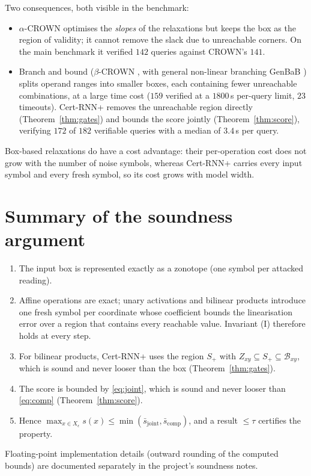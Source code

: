 \documentclass[11pt]{article}
\theoremstyle{definition}
\theoremstyle{remark}
\newcommand{\Bx}{\mathcal{B}}
\begin{document}
Two consequences, both visible in the benchmark:
\begin{itemize}
\item $\alpha$-CROWN \cite{xu2021alphacrown} optimises the \emph{slopes} of the relaxations but keeps the box as the region of validity; it cannot remove the slack due to unreachable corners. On the main benchmark it verified $142$ queries against CROWN's $141$.
\item Branch and bound ($\beta$-CROWN \cite{wang2021betacrown}, with general non-linear branching GenBaB \cite{shi2025genbab}) splits operand ranges into smaller boxes, each containing fewer unreachable combinations, at a large time cost ($159$ verified at a $1800$\,s per-query limit, $23$ timeouts). Cert-RNN+ removes the unreachable region directly (Theorem~\ref{thm:gates}) and bounds the score jointly (Theorem~\ref{thm:score}), verifying $172$ of $182$ verifiable queries with a median of $3.4$\,s per query.
\end{itemize}
Box-based relaxations do have a cost advantage: their per-operation cost does not grow with the number of noise symbols, whereas Cert-RNN+ carries every input symbol and every fresh symbol, so its cost grows with model width.

\section{Summary of the soundness argument}
\begin{enumerate}
\item The input box is represented exactly as a zonotope (one symbol per attacked reading).
\item Affine operations are exact; unary activations and bilinear products introduce one fresh symbol per coordinate whose coefficient bounds the linearisation error over a region that contains every reachable value. Invariant (I) therefore holds at every step.
\item For bilinear products, Cert-RNN+ uses the region $S_+$ with $Z_{xy}\subseteq S_+\subseteq\Bx_{xy}$, which is sound and never looser than the box (Theorem~\ref{thm:gates}).
\item The score is bounded by \eqref{eq:joint}, which is sound and never looser than \eqref{eq:comp} (Theorem~\ref{thm:score}).
\item Hence $\max_{x\in X_\epsilon} s(x) \le \min(\bar s_{\mathrm{joint}},\bar s_{\mathrm{comp}})$, and a result $\le\tau$ certifies the property.
\end{enumerate}
Floating-point implementation details (outward rounding of the computed bounds) are documented separately in the project's soundness notes.
\end{document}
